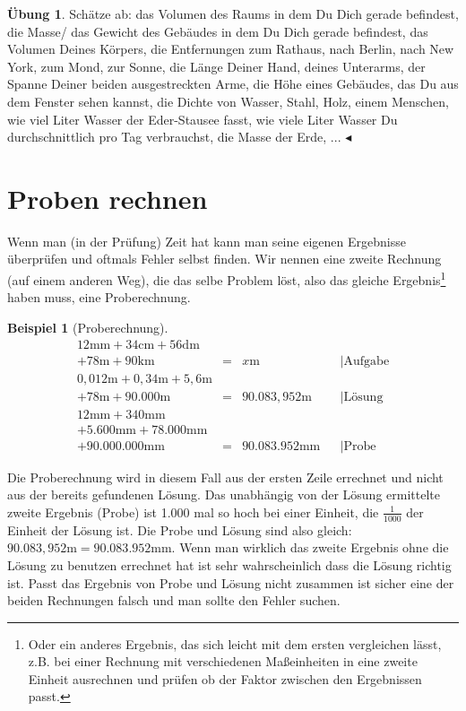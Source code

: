 \documentclass[a4paper]{book}%
\newcommand{\topicend}{
      $\blacktriangleleft$
}
\theoremstyle{definition}
\newtheorem{uebung}{Übung}
\newtheorem{beispiel}{Beispiel}
\begin{document}
\begin{uebung}
    Schätze ab: das Volumen des Raums in dem Du Dich gerade befindest, die Masse/ das Gewicht des Gebäudes in dem Du Dich gerade befindest, das Volumen Deines Körpers, die Entfernungen zum Rathaus, nach Berlin, nach New York, zum Mond, zur Sonne, die Länge Deiner Hand, deines Unterarms, der Spanne Deiner beiden ausgestreckten Arme, die Höhe eines Gebäudes, das Du aus dem Fenster sehen kannst, die Dichte von Wasser, Stahl, Holz, einem Menschen, wie viel Liter Wasser der Eder-Stausee fasst, wie viele Liter Wasser Du durchschnittlich pro Tag verbrauchst, die Masse der Erde, ...\topicend
\end{uebung}


\section{Proben rechnen}

Wenn man (in der Prüfung) Zeit hat kann man seine eigenen Ergebnisse überprüfen und oftmals Fehler selbst finden. Wir nennen eine zweite Rechnung (auf einem anderen Weg), die das selbe Problem löst, also das gleiche Ergebnis\footnote{Oder ein anderes Ergebnis, das sich leicht mit dem ersten vergleichen lässt, z.B. bei einer Rechnung mit verschiedenen Maßeinheiten in eine zweite Einheit ausrechnen und prüfen ob der Faktor zwischen den Ergebnissen passt.} haben muss, eine Proberechnung.

\begin{beispiel}[Proberechnung]
    \begin{align}
      12 \text{mm} + 34 \text{cm} + 56 \text{dm} && &&\\
      + 78 \text{m} + 90 \text{km} &=& x \text{m} && | \text{Aufgabe}\\
      0,012 \text{m} + 0,34 \text{m} + 5,6 \text{m} && &&\\
      + 78 \text{m} + 90.000 \text{m} &=& 90.083,952 \text{m} && | \text{Lösung}\\
      12 \text{mm} + 340 \text{mm} && &&\\
      + 5.600 \text{mm} + 78.000 \text{mm} && &&\\
      + 90.000.000 \text{mm} &=& 90.083.952 \text{mm} && | \text{Probe}
    \end{align}

    Die Proberechnung wird in diesem Fall aus der ersten Zeile errechnet und nicht aus der bereits gefundenen Lösung. Das unabhängig von der Lösung ermittelte zweite Ergebnis (Probe) ist 1.000 mal so hoch bei einer Einheit, die $\frac{1}{1000}$ der Einheit der Lösung ist. Die Probe und Lösung sind also gleich: $90.083,952 \text{m}=90.083.952 \text{mm}$. Wenn man wirklich das zweite Ergebnis ohne die Lösung zu benutzen errechnet hat ist sehr wahrscheinlich dass die Lösung richtig ist. Passt das Ergebnis von Probe und Lösung nicht zusammen ist sicher eine der beiden Rechnungen falsch und man sollte den Fehler suchen.
\end{beispiel}
\end{document}
